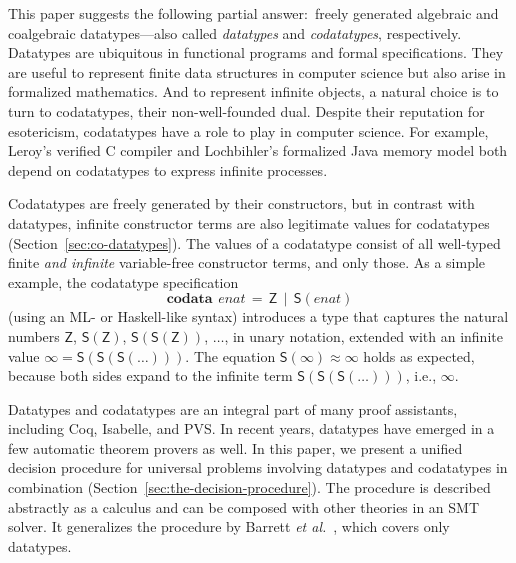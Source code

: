 \documentclass[letter]{article}
\theoremstyle{plain}
\theoremstyle{definition}
\newcommand\keyw[1]{\textbf{#1}}
\newcommand\const[1]{\textsf{#1}}
\newcommand\ty[1]{\textit{#1}}
\newcommand{\teq}{\approx}
\begin{document}
This paper suggests the following partial answer:\ freely generated algebraic
and coalgebraic datatypes---also called \emph{datatypes} and
\emph{codatatypes}, respectively.
Datatypes are ubiquitous in functional programs and formal specifications.
They are useful to represent finite data structures in computer
science but also arise in formalized mathematics.
And to represent infinite objects,
a natural choice is to turn to codatatypes,
their non-well-founded dual.
%
Despite their reputation for esotericism, codatatypes have a
role to play in computer science. For example,
Leroy's verified C compiler %
and Lochbihler's formalized Java memory model
 both depend on codatatypes to express infinite
processes.

Codatatypes are freely generated by their constructors, but in contrast with datatypes,
infinit\-e constructor terms are also legitimate values for codatatypes
(Section~\ref{sec:co-datatypes}). The
values of a codatatype consist of all well-typed finite \emph{and infinite} variable-free
constructor
terms, and only those. As a simple example, the codatatype specification
%
\[\keyw{codata}~\,\ty{enat} \,=\, \const{Z} \,\mid\, \const{S}(\ty{enat})\]
%
(using an ML- or Haskell-like syntax)
introduces a type that
captures the natural numbers $\const{Z}$, $\const{S}(\const{Z})$, $\const{S}(\const{S}(\const{Z}))$, $\dotsc$,
in unary notation, extended with an
infinite value $\infty = \const{S}(\const{S}(\const{S}(\ldots)))$.
The equation $\const{S}(\infty) \teq \infty$ holds as expected,
because both sides expand to the infinite term
$\const{S}(\const{S}(\const{S}(\ldots)))$, i.e., $\infty$.

Datatypes and codatatypes are an integral part of many proof assistants,
including Coq, Isabelle, and PVS. In recent years, datatypes
have emerged in a few automatic theorem provers as well.
In this paper, we present a
unified decision procedure for universal problems involving datatypes and codatatypes
in combination (Section~\ref{sec:the-decision-procedure}).
The procedure is described abstractly as a %
calculus and can be composed with other theories in an SMT solver.
It generalizes the procedure by Barrett {\em et al.}\
,
which covers only datatypes.
\end{document}
